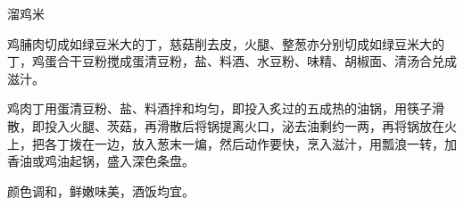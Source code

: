 \begin{recipe}{溜鸡米}

\ingredients


\cooking

\step 鸡脯肉切成如绿豆米大的丁，慈菇削去皮，火腿、整葱亦分别切成如绿豆米大的丁，鸡蛋合干豆粉搅成蛋清豆粉，盐、料酒、水豆粉、味精、胡椒面、清汤合兑成滋汁。

\step 鸡肉丁用蛋清豆粉、盐、料酒拌和均匀，即投入炙过的五成热的油锅，用筷子滑散，即投入火腿、茨菇，再滑散后将锅提离火口，泌去油剩约一两，再将锅放在火上，把各丁拨在一边，放入葱末一煸，然后动作要快，烹入滋汁，用瓢浪一转，加香油或鸡油起锅，盛入深色条盘。

\notes

颜色调和，鲜嫩味美，酒饭均宜。

\end{recipe}


